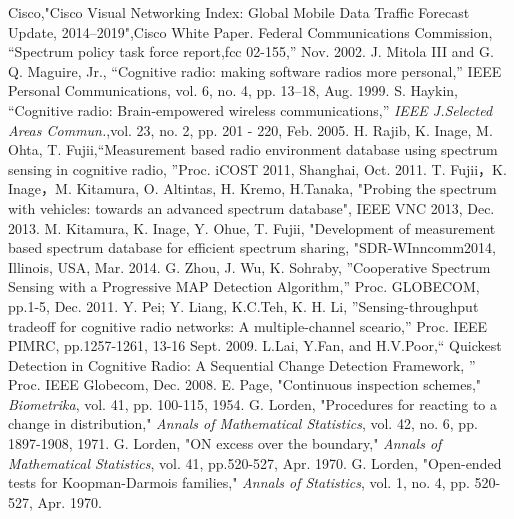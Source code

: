 \begin{thebibliography}{99}
Cisco,"Cisco Visual Networking Index: Global Mobile Data Traffic Forecast Update, 2014–2019",Cisco White Paper.
Federal Communications Commission, ``Spectrum policy task force report,fcc 02-155,'' Nov. 2002.
J. Mitola III and G. Q. Maguire, Jr., ``Cognitive radio: making software radios more personal,'' IEEE Personal Communications, vol. 6, no. 4, pp. 13–18, Aug. 1999.
 S. Haykin, ``Cognitive radio: Brain-empowered wireless communications,'' {\it IEEE J.Selected Areas Commun.},vol. 23, no. 2, pp. 201 - 220, Feb. 2005.
H. Rajib, K. Inage, M. Ohta, T. Fujii,“Measurement based radio environment database using spectrum sensing in cognitive radio, ”Proc. iCOST 2011, Shanghai, Oct. 2011.
T. Fujii，K. Inage，M. Kitamura, O. Altintas, H. Kremo, H.Tanaka, "Probing the spectrum with vehicles: towards an advanced spectrum database", IEEE VNC 2013, Dec. 2013.
M. Kitamura, K. Inage, Y. Ohue, T. Fujii, "Development of measurement based spectrum database for efficient spectrum sharing, "SDR-WInncomm2014, Illinois, USA, Mar. 2014.
G. Zhou, J. Wu, K. Sohraby, ”Cooperative Spectrum Sensing with a Progressive MAP Detection Algorithm,” Proc. GLOBECOM, pp.1-5, Dec. 2011.
Y. Pei; Y. Liang, K.C.Teh, K. H. Li, ”Sensing-throughput tradeoff for cognitive radio networks: A multiple-channel sceario,” Proc. IEEE PIMRC, pp.1257-1261, 13-16 Sept. 2009.
L.Lai, Y.Fan, and H.V.Poor,“ Quickest Detection in Cognitive Radio: A Sequential Change Detection Framework, ” Proc. IEEE Globecom, Dec. 2008.
E. Page, "Continuous inspection schemes," {\it Biometrika}, vol. 41, pp. 100-115, 1954.
G. Lorden, "Procedures for reacting to a change in distribution," {\it Annals of Mathematical Statistics}, vol. 42, no. 6, pp. 1897-1908, 1971.  
G. Lorden, "ON excess over the boundary," {\it Annals of Mathematical Statistics}, vol. 41, pp.520-527, Apr. 1970.
G. Lorden, "Open-ended tests for Koopman-Darmois families," {\it Annals of Statistics}, vol. 1, no. 4, pp. 520-527, Apr. 1970.
\end{thebibliography}
